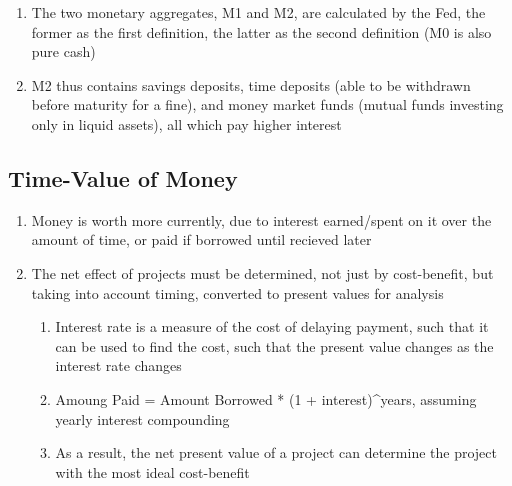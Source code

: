 \documentclass[11 pt, twoside]{article}
\begin{document}
\begin{enumerate}
\begin{enumerate}
\item The two monetary aggregates, M1 and M2, are calculated by the Fed, the former as the first definition, the latter as the second definition (M0 is also pure cash)
\item M2 thus contains savings deposits, time deposits (able to be withdrawn before maturity for a fine), and money market funds (mutual funds investing only in liquid assets), all which pay higher interest
\end{enumerate}
\end{enumerate}

\subsection{Time-Value of Money}
\begin{enumerate}
\item Money is worth more currently, due to interest earned/spent on it over the amount of time, or paid if borrowed until recieved later
\item The net effect of projects must be determined, not just by cost-benefit, but taking into account timing, converted to present values for analysis
\begin{enumerate}
\item Interest rate is a measure of the cost of delaying payment, such that it can be used to find the cost, such that the present value changes as the interest rate changes
\item Amoung Paid = Amount Borrowed * (1 + interest)^years, assuming yearly interest compounding
\item As a result, the net present value of a project can determine the project with the most ideal cost-benefit
\end{enumerate}
\end{enumerate}
\end{document}
